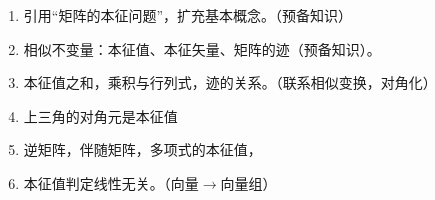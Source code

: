

\begin{issues}
\issueDraft
\begin{enumerate}
\item 引用“矩阵的本征问题”，扩充基本概念。（预备知识）
\item 相似不变量：本征值、本征矢量、矩阵的迹（预备知识）。
\item 本征值之和，乘积与行列式，迹的关系。（联系相似变换，对角化）
\item 上三角的对角元是本征值
\item 逆矩阵，伴随矩阵，多项式的本征值，
\item 本征值判定线性无关。（向量$\rightarrow$向量组）
\end{enumerate}
\end{issues}

